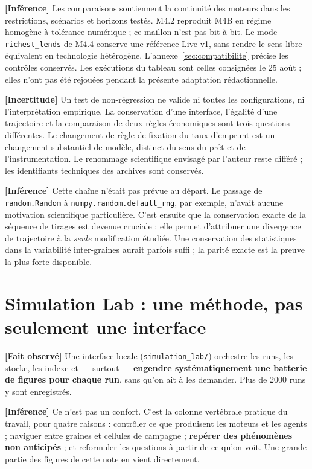 \documentclass[11pt,a4paper]{article}
\newcommand{\code}[1]{\texttt{#1}}
\newcommand{\fait}{\textbf{[Fait observé]}}
\newcommand{\inference}{\textbf{[Inférence]}}
\newcommand{\incertitude}{\textbf{[Incertitude]}}
\begin{document}
\inference{} Les comparaisons soutiennent la continuité des moteurs dans
les restrictions, scénarios et horizons testés. M4.2 reproduit M4B en régime
homogène à tolérance numérique ; ce maillon n'est pas bit à bit.
Le mode \code{richest\_lends} de M4.4 conserve une référence Live-v1,
sans rendre le sens libre équivalent en technologie hétérogène.
L'annexe~\ref{sec:compatibilite} précise les contrôles conservés.
Les exécutions du tableau sont celles consignées le 25 août ; elles n'ont
pas été rejouées pendant la présente adaptation rédactionnelle.

\incertitude{} Un test de non-régression ne valide ni toutes les configurations,
ni l'interprétation empirique. La conservation d'une interface, l'égalité
d'une trajectoire et la comparaison de deux règles économiques sont trois
questions différentes. Le changement de règle de fixation du taux d'emprunt
est un changement substantiel de modèle, distinct du sens du prêt et de
l'instrumentation. Le renommage scientifique envisagé par l'auteur reste
différé ; les identifiants techniques des archives sont conservés.


\inference{} Cette chaîne n'était pas prévue au départ. Le passage de
\code{random.Random} à \code{numpy.random.default\_rng}, par exemple, n'avait
aucune motivation scientifique particulière. C'est ensuite que la conservation
exacte de la séquence de tirages est devenue cruciale : elle permet d'attribuer
une divergence de trajectoire à la \emph{seule} modification étudiée. Une
conservation des statistiques dans la variabilité inter-graines aurait parfois
suffi ; la parité exacte est la preuve la plus forte disponible.

\section{Simulation Lab : une méthode, pas seulement une interface}

\fait{} Une interface locale (\code{simulation\_lab/}) orchestre les runs,
les stocke, les indexe et --- surtout --- \textbf{engendre systématiquement une
batterie de figures pour chaque run}, sans qu'on ait à les demander. Plus de
2000 runs y sont enregistrés.

\inference{} Ce n'est pas un confort. C'est la colonne vertébrale pratique du
travail, pour quatre raisons : contrôler ce que produisent les moteurs et les
agents ; naviguer entre graines et cellules de campagne ; \textbf{repérer des
phénomènes non anticipés} ; et reformuler les questions à partir de ce qu'on
voit. Une grande partie des figures de cette note en vient directement.
\end{document}
